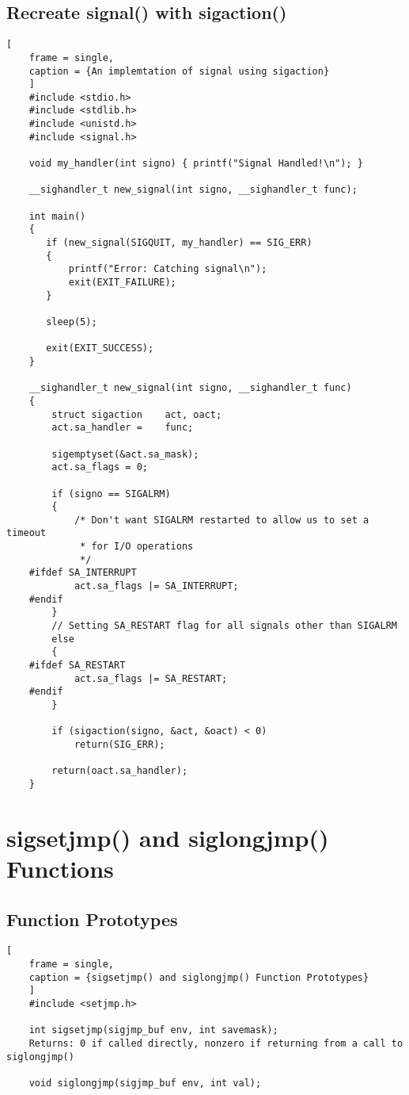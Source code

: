 \documentclass{article}
\begin{document}
\subsection{Recreate \textbf{signal()} with \textbf{sigaction()}}
\begin{lstlisting}[
    frame = single,
    caption = {An implemtation of signal using sigaction}
    ]
    #include <stdio.h>
    #include <stdlib.h>
    #include <unistd.h>
    #include <signal.h>

    void my_handler(int signo) { printf("Signal Handled!\n"); }

    __sighandler_t new_signal(int signo, __sighandler_t func);

    int main()
    {
       if (new_signal(SIGQUIT, my_handler) == SIG_ERR) 
       {
           printf("Error: Catching signal\n");
           exit(EXIT_FAILURE);
       }

       sleep(5);

       exit(EXIT_SUCCESS);
    }

    __sighandler_t new_signal(int signo, __sighandler_t func)
    {
        struct sigaction    act, oact;
        act.sa_handler =    func;

        sigemptyset(&act.sa_mask);
        act.sa_flags = 0;

        if (signo == SIGALRM)
        {
            /* Don't want SIGALRM restarted to allow us to set a timeout 
             * for I/O operations
             */
    #ifdef SA_INTERRUPT
            act.sa_flags |= SA_INTERRUPT;
    #endif
        }
        // Setting SA_RESTART flag for all signals other than SIGALRM
        else 
        {
    #ifdef SA_RESTART
            act.sa_flags |= SA_RESTART;
    #endif
        }

        if (sigaction(signo, &act, &oact) < 0)
            return(SIG_ERR);

        return(oact.sa_handler);
    }
\end{lstlisting}

\section{\textbf{sigsetjmp()} and \textbf{siglongjmp()} Functions}
\subsection{Function Prototypes}
\begin{lstlisting}[
    frame = single,
    caption = {sigsetjmp() and siglongjmp() Function Prototypes}
    ]
    #include <setjmp.h>

    int sigsetjmp(sigjmp_buf env, int savemask);
    Returns: 0 if called directly, nonzero if returning from a call to siglongjmp()

    void siglongjmp(sigjmp_buf env, int val);
\end{lstlisting}
\end{document}
